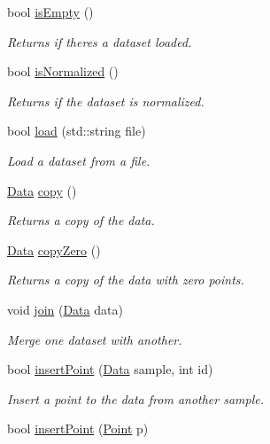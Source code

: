 \begin{DoxyCompactItemize}
bool \hyperlink{class_data_a93468d3b8b2ce0f73e369e5de160534e}{is\+Empty} ()
\begin{DoxyCompactList}\small\item\em Returns if there\textquotesingle{}s a dataset loaded. \end{DoxyCompactList}\item 
bool \hyperlink{class_data_ad96fc8e9c5ec9e40b1dc6d9670eefe0c}{is\+Normalized} ()
\begin{DoxyCompactList}\small\item\em Returns if the dataset is normalized. \end{DoxyCompactList}\item 
bool \hyperlink{class_data_ac2ed251251be234c607f486e16902112}{load} (std\+::string file)
\begin{DoxyCompactList}\small\item\em Load a dataset from a file. \end{DoxyCompactList}\item 
\hyperlink{class_data}{Data} \hyperlink{class_data_afb7687021aa7d5f1ecae464eee601710}{copy} ()
\begin{DoxyCompactList}\small\item\em Returns a copy of the data. \end{DoxyCompactList}\item 
\hyperlink{class_data}{Data} \hyperlink{class_data_ae9f7aeb470be537dc20c43b317dc6478}{copy\+Zero} ()
\begin{DoxyCompactList}\small\item\em Returns a copy of the data with zero points. \end{DoxyCompactList}\item 
void \hyperlink{class_data_a83c2a01ded98c4fad0b5b31538039046}{join} (\hyperlink{class_data}{Data} data)
\begin{DoxyCompactList}\small\item\em Merge one dataset with another. \end{DoxyCompactList}\item 
bool \hyperlink{class_data_abb6aade47d78a284301c32e82b2cbee2}{insert\+Point} (\hyperlink{class_data}{Data} sample, int id)
\begin{DoxyCompactList}\small\item\em Insert a point to the data from another sample. \end{DoxyCompactList}\item 
bool \hyperlink{class_data_a4694df7867fa112b219bbf6ed17880e9}{insert\+Point} (\hyperlink{class_point}{Point} p)

\end{DoxyCompactItemize}
